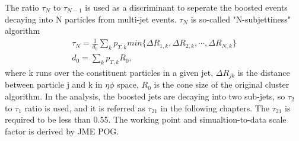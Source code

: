 The ratio $\tau _N $ to $\tau _{N-1}$ is used as a discriminant to seperate the boosted events decaying into N particles from multi-jet events. $\tau _N $ is so-called "N-subjettiness" algorithm\citep{Thaler:2010tr,Thaler:2011gf,Stewart:2010tn}
\begin{equation} \label{eq6}
\begin{split}
\tau _N = \frac{1}{d_0} \sum\limits_{k}  p_{T,k} min \{ \Delta R_{1,k},\Delta R_{2,k},\cdots,\Delta R_{N,k} \} \\
d_0 = \sum\limits_{k}  p_{T,k} R_0,
\end{split}
\end{equation}
where k runs over the constituent particles in a given jet, $\Delta R_{jk}$ is the distance between particle j and k in $\eta \phi$ space, $R_0$ is the cone size of the original cluster algorithm. In the analysis, the boosted jets are decaying into two sub-jets, so $\tau _2 $ to $\tau _1$ ratio is used, and it is referred as $\tau _{21}$ in the following chapters.
The $\tau _{21}$ is required to be less than 0.55.  
The working point and simualtion-to-data scale factor is derived by JME POG\citep{WTagTWikiWPs}.

